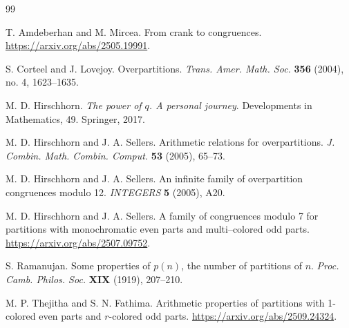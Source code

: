 \documentclass[10pt, reqno]{amsart}
\theoremstyle{theorem}
\theoremstyle{definition}
\theoremstyle{example}
\begin{document}
\begin{thebibliography}{99}

T. Amdeberhan and M. Mircea. From crank to congruences.  \url{https://arxiv.org/abs/2505.19991}.

S. Corteel and J. Lovejoy. Overpartitions. \emph{Trans. Amer. Math. Soc.} {\bf 356} (2004), no. 4, 1623--1635.

M. D. Hirschhorn.  \emph{The power of $q$.  A personal journey}.  Developments in Mathematics, 49. Springer, 2017.

M. D. Hirschhorn and J. A. Sellers.  Arithmetic relations for overpartitions. \emph{J. Combin. Math. Combin. Comput.} {\bf 53} (2005), 65--73.

M. D. Hirschhorn and J. A. Sellers.  An infinite family of overpartition congruences modulo 12.  \emph{INTEGERS} {\bf 5} (2005), A20.  

M. D. Hirschhorn and J. A. Sellers.  A family of congruences modulo 7 for partitions with monochromatic even parts and multi--colored odd parts.  \url{https://arxiv.org/abs/2507.09752}.

S. Ramanujan.  Some properties of $p(n)$, the number of partitions of $n$.  \emph{Proc. Camb. Philos. Soc.} {\bf XIX} (1919), 207--210.

M. P. Thejitha and S. N. Fathima.  Arithmetic properties of partitions with 1-colored even parts and $r$-colored odd parts.  \url{https://arxiv.org/abs/2509.24324}.

\end{thebibliography}
\end{document}
